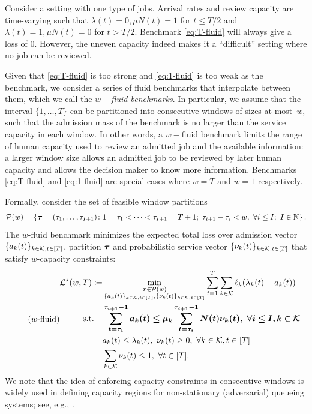 \begin{example}\label{ex:fluid}
Consider a setting with one type of jobs. Arrival rates and review capacity are time-varying such that $\lambda(t) = 0, \mu N(t) = 1$ for $t \leq T / 2$ and $\lambda(t) = 1, \mu N(t) = 0$ for $t > T / 2$. Benchmark \eqref{eq:T-fluid} will always give a loss of $0$. However, the uneven capacity indeed makes it a ``difficult'' setting where no job can be reviewed.
\end{example}
Given that \eqref{eq:T-fluid} is too strong and \eqref{eq:1-fluid} is too weak as the benchmark, we consider a series of fluid benchmarks that interpolate between them, which we call the \emph{$w-$fluid benchmarks}. In particular, we assume that the interval $\{1,\ldots, T\}$ can be partitioned into consecutive windows of sizes at most~$w$, such that the admission mass of the benchmark is no larger than the service capacity in each window. In other words, a $w-$fluid benchmark limits the range of human capacity used to review an admitted job and the available information: a larger window size allows an admitted job to be reviewed by later human capacity and allows the decision maker to know more information. Benchmarks \eqref{eq:T-fluid} and \eqref{eq:1-fluid} are special cases where $w=T$ and $w = 1$ respectively. 

Formally, consider the set of feasible window partitions \[\mathcal{P}(w) = \left\{\boldsymbol{\tau}=(\tau_1,\ldots,\tau_{I+1})\colon 1 = \tau_1 < \cdots < \tau_{I+1}=T+1;~\tau_{i+1}-\tau_i < w,~\forall i \leq I;~I \in \mathbb{N}\right\}.\]
The $w$-fluid benchmark minimizes the expected total loss over admission vector $\{a_k(t)\}_{k \in \mathcal{K}, t \in [T]}$, partition $\boldsymbol{\tau}$ and probabilistic service vector $\{\nu_k(t)\}_{k \in \mathcal{K}, t \in [T]}$ that satisfy $w$-capacity constraints:
\begin{equation}\label{eq:w-fluid}
\tag{$w$-fluid}
\begin{aligned}
\mathcal{L}^\star(w,T) \coloneqq &\min_{\substack{\boldsymbol{\tau} \in \mathcal{P}(w)\\\{a_k(t)\}_{k \in \mathcal{K}, t \in [T]},\{\nu_k(t)\}_{k \in \mathcal{K},t \in [T]}}} \sum_{t=1}^T \sum_{k \in \mathcal{K}} \ell_k(\lambda_k(t) - a_k(t)) \\
\text{s.t.}\quad& \boldsymbol{\sum_{t=\tau_i}^{\tau_{i+1}-1} a_k(t) \leq \mu_k\sum_{t=\tau_i}^{\tau_{i+1}-1} N(t)\nu_k(t),~\forall i \leq I, k \in \mathcal{K}} \\
&a_k(t) \leq \lambda_k(t),~\nu_k(t) \geq 0,~\forall k \in \mathcal{K}, t\in [T] \\
& \sum_{k\in \mathcal{K}} \nu_k(t) \leq 1,~\forall t \in [T].
\end{aligned}
\end{equation}
We note that the idea of enforcing capacity constraints in consecutive windows is widely used in defining capacity regions for non-stationary (adversarial) queueing systems; see, e.g., \cite{borodin2001adversarial,liang2018minimizing,yang2023learning,nguyen2023learning}. 

